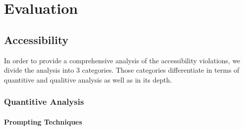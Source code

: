 \chapter{Evaluation}\label{chapter:Evaluation}


\section{Accessibility}
In order to provide a comprehensive analysis of the accessibility violations, 
we divide the analysis into 3 categories. Those categories differentiate in 
terms of quantitive and qualitive analysis as well as in its depth.

\subsection{Quantitive Analysis}
\subsubsection{Prompting Techniques}
